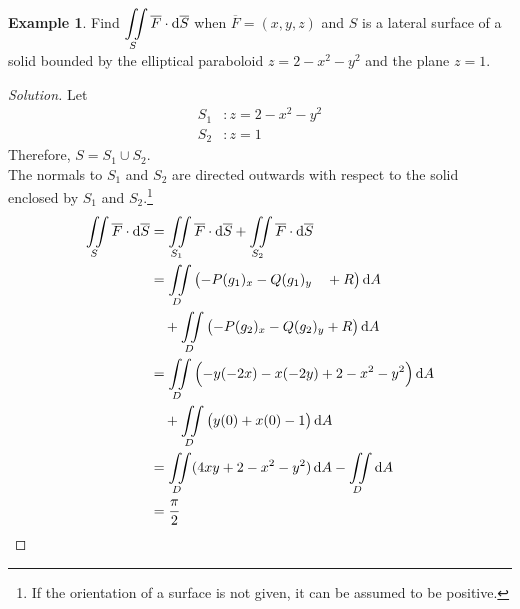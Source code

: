 \documentclass[fleqn, a4paper, 12pt]{article}
\theoremstyle{definition}
\newtheorem{example}{Example}
\theoremstyle{theorem}
\theoremstyle{remark}
\newenvironment{solution}
{\begin{proof}[Solution]\let\qed\relax}
	{\end{proof}}
\begin{document}
\begin{example}
	Find $\displaystyle \iint\limits_{S} \overline{F} \cdot \dif \overline{S}$ when $\overline{F} = (x,y,z)$ and $S$ is a lateral surface of a solid bounded by the elliptical paraboloid $z = 2 - x^2 - y^2$ and the plane $z = 1$.
\end{example}

\begin{solution}
	Let
	\begin{align*}
		S_1 &: z = 2 - x^2 - y^2\\
		S_2 &: z = 1
	\end{align*}
	Therefore, $S = S_1 \cup S_2$.\\
	The normals to $S_1$ and $S_2$ are directed outwards with respect to the solid enclosed by $S_1$ and $S_2$.\footnote{If the orientation of a surface is not given, it can be assumed to be positive.}
	\begin{align*}
		\iint\limits_{S} \overline{F} \cdot \dif \overline{S} &= \iint\limits_{S_1} \overline{F} \cdot \dif \overline{S} + \iint\limits_{S_2} \overline{F} \cdot \dif \overline{S}\\
		&= \iint\limits_{D} \left( -P(g_1)_x - Q(g_1)_y \quad + R \right) \dif A\\
		&\quad + \iint\limits_{D} \left( -P(g_2)_x - Q(g_2)_y + R \right) \dif A\\
		&= \iint\limits_{D} \left( -y (-2x) - x(-2y) + 2 - x^2 - y^2 \right) \dif A\\
		&\quad + \iint\limits_{D} \left( y(0) + x(0) - 1 \right) \dif A\\
		&= \iint\limits_{D} (4xy + 2 - x^2 - y^2) \dif A - \iint\limits_{D} \dif A\\
		&= \dfrac{\pi}{2}
	\end{align*}
\end{solution}
\end{document}
